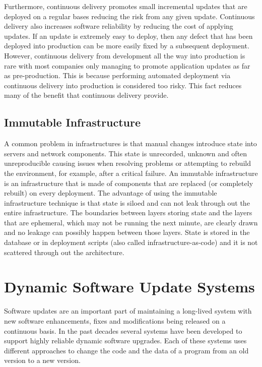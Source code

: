 \documentclass[a4paper,11pt,twoside]{report}
\begin{document}
Furthermore, continuous delivery promotes small incremental updates that are deployed on a regular bases reducing the risk from any given update. Continuous delivery also increases software reliability by reducing the cost of applying updates. If an update is extremely easy to deploy, then any defect that has been deployed into production can be more easily fixed by a subsequent deployment. However, continuous delivery from development all the way into production is rare with most companies only managing to promote application updates as far as pre-production. This is because performing automated deployment via continuous delivery into production is considered too risky. This fact reduces many of the benefit that continuous delivery provide.

\subsection{Immutable Infrastructure}
 A common problem in infrastructures is that manual changes introduce state into servers and network components.  This state is unrecorded, unknown and often unreproducible causing issues when resolving problems or attempting to rebuild the environment, for example, after a critical failure.  An immutable infrastructure is an infrastructure that is made of components that are replaced (or completely rebuilt) on every deployment.  The advantage of using the immutable infrastructure technique is that state is siloed and can not leak through out the entire infrastructure.  The boundaries between layers storing state and the layers that are ephemeral, which may not be running the next minute, are clearly drawn and no leakage can possibly happen between those layers. State is stored in the database or in deployment scripts (also called infrastructure-as-code) and it is not scattered through out the architecture. 

\section{Dynamic Software Update Systems} \label{DSU}
Software updates are an important part of maintaining a long-lived system with new software enhancements, fixes and modifications being released on a continuous basis. In the past decades several systems have been developed to support highly reliable dynamic software upgrades. Each of these systems uses different approaches to change the code and the data of a program from an old version to a new version. 
\end{document}
